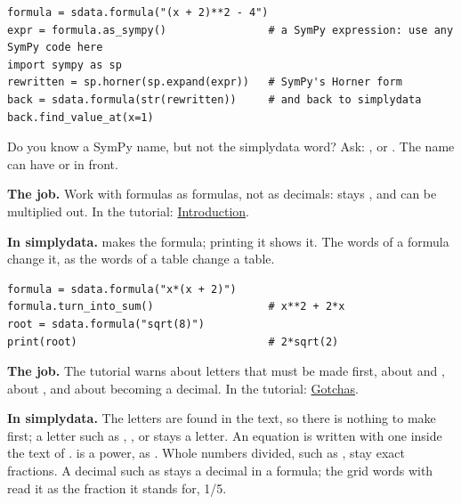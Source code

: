 \begin{lstlisting}[style=py]
formula = sdata.formula("(x + 2)**2 - 4")
expr = formula.as_sympy()                # a SymPy expression: use any SymPy code here
import sympy as sp
rewritten = sp.horner(sp.expand(expr))   # SymPy's Horner form
back = sdata.formula(str(rewritten))     # and back to simplydata
back.find_value_at(x=1)
\end{lstlisting}

Do you know a SymPy name, but not the simplydata word? Ask: ,
 or . The name can have
 or  in front.


\textbf{The job.} Work with formulas as formulas, not as decimals:  stays
, and  can be multiplied out. In the tutorial:
\href{https://docs.sympy.org/latest/tutorials/intro-tutorial/intro.html}{Introduction}.

\textbf{In simplydata.}  makes the formula; printing it shows it. The words of
a formula change it, as the words of a table change a table.

\begin{lstlisting}[style=py]
formula = sdata.formula("x*(x + 2)")
formula.turn_into_sum()                  # x**2 + 2*x
root = sdata.formula("sqrt(8)")
print(root)                              # 2*sqrt(2)
\end{lstlisting}


\textbf{The job.} The tutorial warns about letters that must be made first, about \code{=} and
\code{==}, about \code{\^{}}, and about  becoming a decimal. In the tutorial:
\href{https://docs.sympy.org/latest/tutorials/intro-tutorial/gotchas.html}{Gotchas}.

\textbf{In simplydata.} The letters are found in the text, so there is nothing to make first; a letter
such as , ,  or  stays a letter. An equation is written with one
\code{=} inside the text of . \code{\^{}} is a power, as \code{**}. Whole numbers
divided, such as , stay exact fractions. A decimal such as  stays a decimal in a
formula; the grid words with  read it as the fraction it stands for, 1/5.

